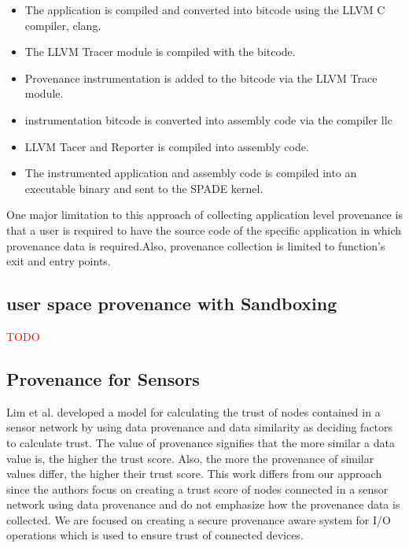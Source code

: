 \begin{itemize}
\item The application is compiled and converted into bitcode using the LLVM C compiler, clang.

\item The LLVM Tracer module is compiled with the bitcode.

\item Provenance instrumentation is added to the bitcode via the LLVM Trace module.

\item instrumentation bitcode is converted into assembly code via the compiler llc

\item LLVM Tacer and Reporter is compiled into assembly code.

\item  The instrumented application and assembly code is compiled into an executable binary and sent to the SPADE kernel.
\end{itemize}

One major limitation to this approach of collecting application level provenance is that a user is required to have the source code of the specific application in which provenance data is required.Also, provenance collection is limited to function's exit and entry points.






\subsection{user space provenance with Sandboxing}
\textcolor{red}{TODO}


\subsection{Provenance for Sensors}
Lim et al. developed a
model for calculating the trust of nodes contained in a sensor network by using data
provenance and data similarity as deciding factors to calculate trust. The value of
provenance signifies that the more similar a data value is, the higher the trust score.
Also, the more the provenance of similar values differ, the higher their trust score.
This work differs from our approach since the authors focus on creating a trust score
of nodes connected in a sensor network using data provenance and do not emphasize
how the provenance data is collected. We are focused on creating a secure
provenance aware system for I/O operations which is used to ensure trust of
connected devices.




